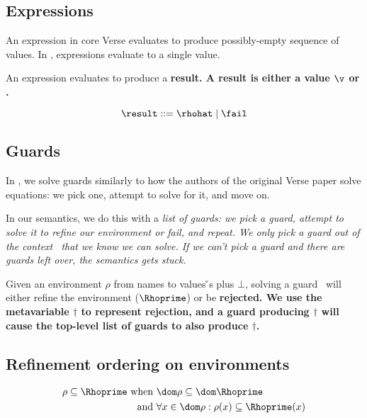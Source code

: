 \documentclass[manuscript,screen,review, 12pt, nonacm]{acmart}
\begin{document}
\bigskip
    
    \subsection{Expressions}
    
    \newcommand\GNoTree{\vmrung \rightsquigarrow \uppsidown} 
    
    An expression in core Verse evaluates to produce possibly-empty sequence of
    values. In {\VMinus}, expressions evaluate to a single value. 

    An expression evaluates to produce a \bf{result}. A result is either a
    value $\v$ or \fail. 
    
    \[\result\; \rm{::=}\; \rhohat\; \vert \; \fail \]
    
\subsection{Guards}

In {\VMinus}, we solve guards similarly to how the authors of the original Verse
paper solve equations: we pick one, attempt to solve for it, and move on. 

In our semantics, we do this with a \it{list} of guards: we pick a guard,
attempt to solve it to refine our environment or fail, and repeat. We only pick
a guard out of the context \context\ that we know we can solve. If we can't pick
a guard and there are guards left over, the semantics gets stuck.

Given an environment $\rho$ from names to values {\v}s plus $\bot$, solving a
guard \g\ will either refine the environment ($\Rhoprime$) or be \bf{rejected}.
We use the metavariable $\dagger$ to represent rejection, and a guard producing
$\dagger$ will cause the top-level list of guards to also produce $\dagger$. 

    \gfail

    \subsection{Refinement ordering on environments}

    \begin{align*}
    \rho \subseteq \Rhoprime \text{ when }&\dom\rho  \subseteq \dom \Rhoprime\\
    \text{ and } &\forall x \in \dom \rho: \rho(x) \subseteq \Rhoprime(x)
    \end{align*}
    
\end{document}
